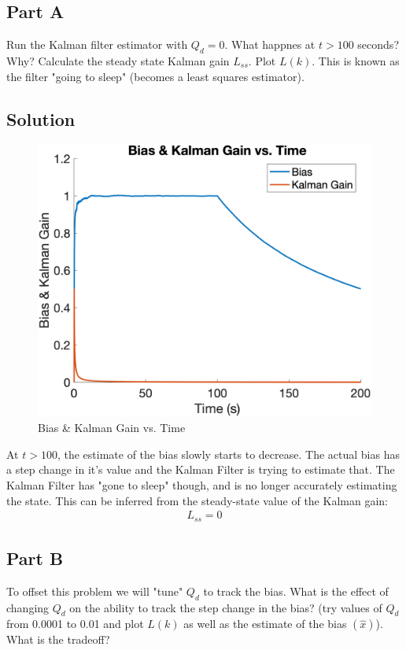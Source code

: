 \documentclass{article}
\begin{document}
\subsection*{Part A}
Run the Kalman filter estimator with $Q_d=0$.  What happnes at $t>100$ seconds? Why? Calculate the steady state Kalman gain $L_{ss}$. Plot $L(k)$.  
This is known as the filter "going to sleep" (becomes a least squares estimator).
\subsection*{Solution}
\begin{figure}[H]
    \centering
    \includegraphics[width=0.75\linewidth]{../figures/p2a.png}
    \caption{Bias \& Kalman Gain vs. Time}\label{fig:p2a}
\end{figure}
At $t>100$, the estimate of the bias slowly starts to decrease.  The actual bias has a step change in it's value and the Kalman Filter is trying 
to estimate that.  The Kalman Filter has "gone to sleep" though, and is no longer accurately estimating the state.   This can be inferred from the 
steady-state value of the Kalman gain:
\begin{gather*}
    L_{ss} = 0
\end{gather*}

\subsection*{Part B}
To offset this problem we will "tune" $Q_d$ to track the bias.  What is the effect of changing $Q_d$ on the ability to track the step change in the 
bias? (try values of $Q_d$ from 0.0001 to 0.01 and plot $L(k)$ as well as the estimate of the bias $(\hat{x})$).  What is the tradeoff?
\end{document}
